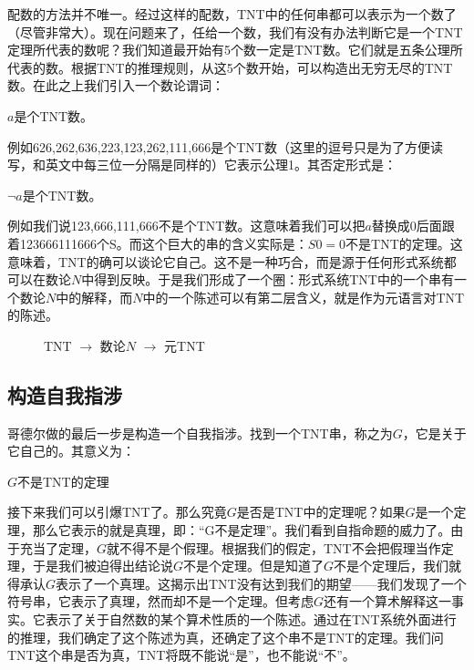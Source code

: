 \documentclass{article}
\begin{document}
配数的方法并不唯一。经过这样的配数，TNT中的任何串都可以表示为一个数了（尽管非常大）。现在问题来了，任给一个数，我们有没有办法判断它是一个TNT定理所代表的数呢？我们知道最开始有5个数一定是TNT数。它们就是五条公理所代表的数。根据TNT的推理规则，从这5个数开始，可以构造出无穷无尽的TNT数。在此之上我们引入一个数论谓词：

\begin{center}
$a$是个TNT数。
\end{center}

例如626,262,636,223,123,262,111,666是个TNT数（这里的逗号只是为了方便读写，和英文中每三位一分隔是同样的）它表示公理1。其否定形式是：

\begin{center}
$\lnot a$是个TNT数。
\end{center}

例如我们说123,666,111,666不是个TNT数。这意味着我们可以把$a$替换成0后面跟着123666111666个S。而这个巨大的串的含义实际是：$S0 = 0$不是TNT的定理。这意味着，TNT的确可以谈论它自己。这不是一种巧合，而是源于任何形式系统都可以在数论$N$中得到反映。于是我们形成了一个圈：形式系统TNT中的一个串有一个数论$N$中的解释，而$N$中的一个陈述可以有第二层含义，就是作为元语言对TNT的陈述。

\begin{figure}[htbp]
\centering
{}
\caption{TNT $\to$ 数论$N$ $\to$ 元TNT}
\label{fig:TNT-N-TNT}
\end{figure}

\subsection{构造自我指涉}

哥德尔做的最后一步是构造一个自我指涉。找到一个TNT串，称之为$G$，它是关于它自己的。其意义为：

\begin{center}
$G$不是TNT的定理
\end{center}

接下来我们可以引爆TNT了。那么究竟$G$是否是TNT中的定理呢？如果$G$是一个定理，那么它表示的就是真理，即：“G不是定理”。我们看到自指命题的威力了。由于充当了定理，$G$就不得不是个假理。根据我们的假定，TNT不会把假理当作定理，于是我们被迫得出结论说$G$不是个定理。但是知道了$G$不是个定理后，我们就得承认$G$表示了一个真理。这揭示出TNT没有达到我们的期望——我们发现了一个符号串，它表示了真理，然而却不是一个定理。但考虑$G$还有一个算术解释这一事实。它表示了关于自然数的某个算术性质的一个陈述。通过在TNT系统外面进行的推理，我们确定了这个陈述为真，还确定了这个串不是TNT的定理。我们问TNT这个串是否为真，TNT将既不能说“是”，也不能说“不”。
\end{document}

